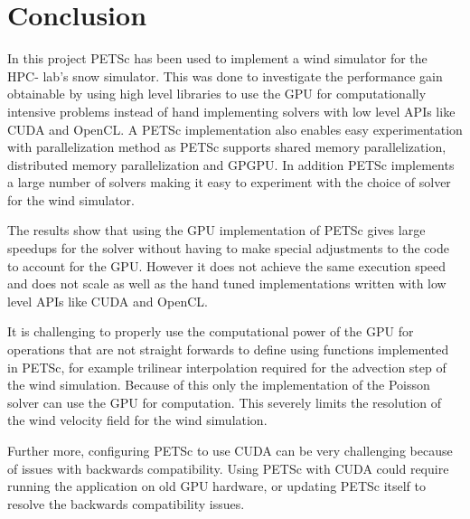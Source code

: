 \chapter{Conclusion}

In this project PETSc has been used to implement a wind simulator for the HPC-
lab's snow simulator. This was done to investigate the performance gain
obtainable by using high level libraries to use the GPU for computationally
intensive problems instead of hand implementing solvers with low level APIs like
CUDA and OpenCL. A PETSc implementation also enables easy experimentation with
parallelization method as PETSc supports shared memory parallelization,
distributed memory parallelization and GPGPU. In addition PETSc implements a
large number of solvers making it easy to experiment with the choice of solver
for the wind simulator.

The results show that using the GPU implementation of PETSc gives large speedups
for the solver without having to make special adjustments to the code to account
for the GPU. However it does not achieve the same execution speed and does not
scale as well as the hand tuned implementations written with low level APIs like
CUDA and OpenCL.

It is challenging to properly use the computational power of the GPU for
operations that are not straight forwards to define using functions implemented
in PETSc, for example trilinear interpolation required for the advection step of
the wind simulation. Because of this only the implementation of the Poisson
solver can use the GPU for computation. This severely limits the resolution of
the wind velocity field for the wind simulation.

Further more, configuring PETSc to use CUDA can be very challenging because of
issues with backwards compatibility. Using PETSc with CUDA could require running
the application on old GPU hardware, or updating PETSc itself to resolve the
backwards compatibility issues.
